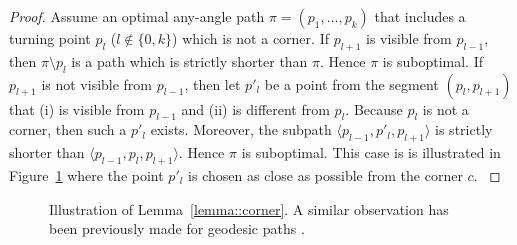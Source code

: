 \begin{proof}
{
  Assume an optimal any-angle path $\pi = (p_1,\dots,p_k)$ 
  that includes a turning point $p_l$ ($l \not\in \{0,k\}$) 
  which is not a corner.  
  If $p_{l+1}$ is visible from $p_{l-1}$, 
  then  $\pi \setminus p_l$ is a path 
  which is strictly shorter than $\pi$.  
  Hence $\pi$ is suboptimal.  
  If $p_{l+1}$ is not visible from $p_{l-1}$, 
  then let $p'_{l}$ be a point from the segment $(p_l,p_{l+1})$ 
  that (i) is visible from $p_{l-1}$ 
  and (ii) is different from $p_l$.  
  Because $p_l$ is not a corner, 
  then such a $p'_l$ exists.  
  Moreover, the subpath $\langle p_{l-1}, p'_{l}, p_{l+1} \rangle$ is 
  strictly shorter than $\langle p_{l-1}, p_{l}, p_{l+1}\rangle$. 
  Hence $\pi$ is suboptimal.
  This case is is illustrated in Figure~\ref{fig::corner}  
  where the point $p'_l$ is chosen as close as possible from the corner $c$.  
}
\end{proof}


\begin{figure}[tb]
  \begin{center}
    
  \end{center}
  \caption{Illustration of Lemma~\ref{lemma::corner}.
  A similar observation has been previously made for geodesic paths \cite{mitchell87}.  }
  \label{fig::corner}
\end{figure}


